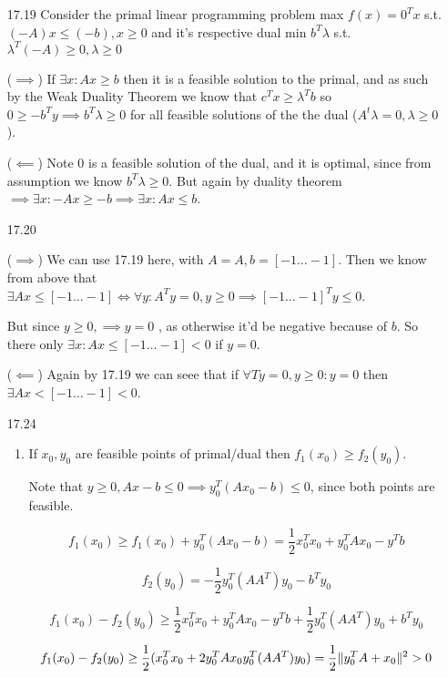 \documentclass[10pt,a4paper]{article}
\DeclarePairedDelimiter{\l2}{\lVert}{\rVert}
\begin{document}
\begin{enumerate}
    \item [17.19] Consider the primal linear programming problem max $f(x) = 0^Tx$ s.t. $(-A)x \leq (-b), x \geq 0$ and it's respective dual min $b^T\lambda$ s.t. $\lambda^T(-A) \geq 0, \lambda \geq 0$
    
    ($\implies$) If $\exists x: Ax \geq b$ then it is a feasible solution to the primal, and as such by the Weak Duality Theorem we know that $c^Tx \geq \lambda^Tb$ so $0 \geq - b^Ty \implies b^T\lambda \geq 0$ for all feasible solutions of the the dual ($A^t\lambda = 0, \lambda \geq 0$).
   
    ($\impliedby$) Note $0$ is a feasible solution of the dual, and it is optimal, since from assumption we know $b^T\lambda \geq 0$. But again by duality theorem $\implies \exists x : -Ax \geq -b \implies \exists x : Ax \leq b$.

    \item [17.20]
    
    ($\implies$) We can use 17.19 here, with $ A = A, b = [-1 \ldots -1]$. Then we know from above that $\exists Ax \leq [-1 \ldots -1] \iff \forall y : A^Ty = 0, y \geq 0 \implies [-1 \ldots -1]^Ty \leq 0$.
    
    But since $ y \geq 0 , \implies  y =0$ , as otherwise it'd be negative because of $b$. So there only $\exists x: Ax \leq [-1 \ldots -1] < 0$ if $y =0$.

   ($\impliedby$) Again by 17.19 we can seee that if $\forall Ty = 0, y\geq 0 : y=0$ then $\exists Ax < [-1 \ldots -1 ] < 0 $.

    \item [17.24] \begin{enumerate}
        \item If $x_0, y_0$ are feasible points of primal/dual then $f_1(x_0) \geq f_2(y_0)$.
        
        Note that $y \geq 0 , Ax-b \leq 0 \implies y_0^T(Ax_0-b) \leq 0$, since both points are feasible.

        $$f_1(x_0) \geq f_1(x_0) + y_0^T(Ax_0 - b) = \frac{1}{2}x_0^Tx_0 + y_0^TAx_0 - y^Tb$$

        $$f_2(y_0) =  - \frac{1}{2} y_0^T(AA^T)y_0 - b^T y_0$$

        $$f_1(x_0) - f_2(y_0) \geq \frac{1}{2}x_0^Tx_0 + y_0^TAx_0 - y^Tb + \frac{1}{2} y_0^T(AA^T)y_0 + b^T y_0$$

        $$f_1(x_0) - f_2(y_0) \geq \frac{1}{2} (x_0^Tx_0 + 2y_0^TAx_0 y_0^T(AA^T)y_0) = \frac{1}{2}\l2{y_0^TA+x_0}^2 > 0 $$


\end{enumerate}
\end{enumerate}
\end{document}
